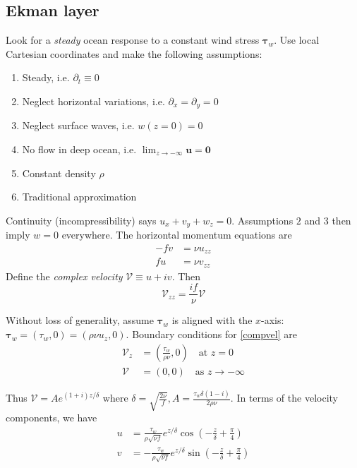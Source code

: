 \documentclass{jknotes}
\begin{document}
\subsection{Ekman layer}
Look for a \emph{steady} ocean response to a constant wind stress
$\symbf{\tau}_w$. Use local Cartesian coordinates and make the following assumptions:
\begin{enumerate}
	\item Steady, i.e. $\partial_t \equiv 0$
	\item Neglect horizontal variations, i.e. $\partial_x = \partial_y = 0$
	\item Neglect surface waves, i.e. $w(z=0) = 0$
	\item No flow in deep ocean, i.e. $\lim_{z \to -\infty} \symbf{u} = \symbf{0}$
	\item Constant density $\rho$
	\item Traditional approximation
\end{enumerate}

Continuity (incompressibility) says $u_x + v_y + w_z = 0$. Assumptions $2$ and
$3$ then imply $w = 0$ everywhere. The horizontal momentum equations are
\begin{align}
	-fv &= \nu u_{zz} \label{hmom1} \\
	fu &= \nu v_{zz} \label{hmom2}
\end{align}
Define the \emph{complex velocity} $\mathcal{V} \equiv u+iv$. Then
\begin{equation}
	\mathcal{V}_{zz} = \frac{if}{\nu} \mathcal{V} \label{compvel}
\end{equation}

Without loss of generality, assume $\symbf{\tau}_w$ is aligned with the $x$-axis:
$\symbf{\tau}_w = (\tau_w, 0) = (\rho \nu u_z, 0)$. Boundary conditions for
\eqref{compvel} are
\begin{equation}
	\begin{aligned}
		\mathcal{V}_z &= \left( \frac{\tau_w}{\rho \nu}, 0\right) \hspace{1em}
		\text{at} \, \, z = 0 \\
		\mathcal{V} &= (0,0) \hspace{1em} \text{as}\,\, z \to -\infty
	\end{aligned}
\end{equation}

Thus $\mathcal{V} = Ae^{(1+i)z/\delta}$ where $\delta = \sqrt{\frac{2\nu}{f}},
A = \frac{\tau_w \delta (1-i)}{2 \rho \nu}$. In terms of the velocity
components, we have
\begin{equation}
	\begin{aligned}
		u &= \frac{\tau_w}{\rho \sqrt{\nu f}} e^{z/\delta} \cos \left(
		-\frac{z}{\delta} + \frac{\pi}{4}\right) \\
		v &= -\frac{\tau_w}{\rho \sqrt{\nu f}} e^{z/\delta} \sin \left(
		-\frac{z}{\delta} + \frac{\pi}{4}\right) \\
	\end{aligned}
\end{equation}
\end{document}
